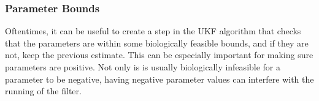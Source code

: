\begin{appendices}
\subsubsection{Parameter Bounds}
Oftentimes, it can be useful to create a step in the UKF algorithm that checks that the parameters are within some biologically feasible bounds, and if they are not, keep the previous estimate. This can be especially important for making sure parameters are positive. Not only is is usually biologically infeasible for a parameter to be negative, having negative parameter values can interfere with the running of the filter. 




\end{appendices}